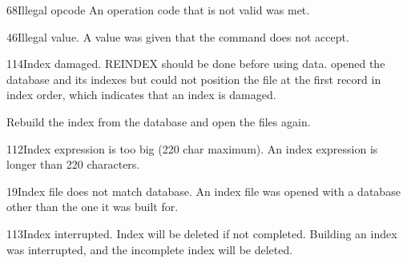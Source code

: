 \begin{XbaseMessageEntry}{68}{Illegal opcode}
An operation code that is not valid was met.
\end{XbaseMessageEntry}

\begin{XbaseMessageEntry}{46}{Illegal value.}
A value was given that the command does not accept.
\end{XbaseMessageEntry}

\begin{XbaseMessageEntry}{114}{Index damaged.  REINDEX should be done before using data.}
 opened the database and its indexes but could not position the file at the first record in index order, which indicates that an index is damaged.

Rebuild the index from the database and open the files again.
\end{XbaseMessageEntry}

\begin{XbaseMessageEntry}{112}{Index expression is too big (220 char maximum).}
An index expression is longer than 220 characters.
\end{XbaseMessageEntry}

\begin{XbaseMessageEntry}{19}{Index file does not match database.}
An index file was opened with a database other than the one it was built for.
\end{XbaseMessageEntry}

\begin{XbaseMessageEntry}{113}{Index interrupted.  Index will be deleted if not completed.}
Building an index was interrupted, and the incomplete index will be deleted.
\end{XbaseMessageEntry}

